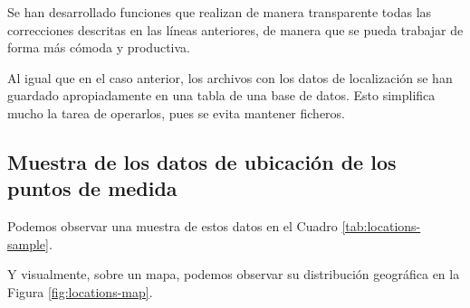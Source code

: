 \documentclass[]{book}
\begin{document}
Se han desarrollado funciones que realizan de manera transparente todas
las correcciones descritas en las líneas anteriores, de manera que se
pueda trabajar de forma más cómoda y productiva.

Al igual que en el caso anterior, los archivos con los datos de
localización se han guardado apropiadamente en una tabla de una base de
datos. Esto simplifica mucho la tarea de operarlos, pues se evita
mantener ficheros.

\subsection{Muestra de los datos de ubicación de los puntos de
medida}\label{muestra-de-los-datos-de-ubicacion-de-los-puntos-de-medida}

Podemos observar una muestra de estos datos en el Cuadro
\ref{tab:locations-sample}.

\begin{table}[!h]

\caption{\label{tab:locations-sample}Muestra de datos de localización de los puntos de medida (Septiembre 2018)}
\centering
{}
\end{table}

Y visualmente, sobre un mapa, podemos observar su distribución
geográfica en la Figura \ref{fig:locations-map}.
\end{document}
